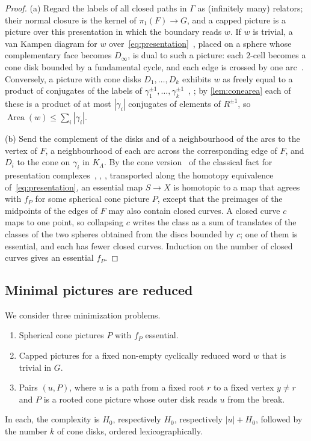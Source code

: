 \documentclass[11pt]{article}
\theoremstyle{definition}
\theoremstyle{plain}
\newcommand{\Area}{\operatorname{Area}}
\begin{document}
\begin{proof}
(a) Regard the labels of all closed paths in $\Gamma$ as (infinitely many) relators; their normal closure is the kernel of $\pi_1(F)\to G$, and a capped picture is a picture over this presentation in which the boundary reads $w$. If $w$ is trivial, a van Kampen diagram for $w$ over~\eqref{eq:presentation}~\cite[Ch.~V]{LyndonSchupp1977}, placed on a sphere whose complementary face becomes $D_\infty$, is dual to such a picture: each $2$-cell becomes a cone disk bounded by a fundamental cycle, and each edge is crossed by one arc~\cite{Rourke1979,Pride1991}. Conversely, a picture with cone disks $D_1,\dots,D_k$ exhibits $w$ as freely equal to a product of conjugates of the labels of $\gamma_1^{\pm1},\dots,\gamma_k^{\pm1}$~\cite[\S1]{Pride1991}, \cite{BogleyPride1993}; by \cref{lem:conearea} each of these is a product of at most $|\gamma_i|$ conjugates of elements of $R^{\pm1}$, so $\Area(w)\le\sum_i|\gamma_i|$.

(b) Send the complement of the disks and of a neighbourhood of the arcs to the vertex of $F$, a neighbourhood of each arc across the corresponding edge of $F$, and $D_i$ to the cone on $\gamma_i$ in $K_\Lambda$. By the cone version~\cite[Lemma~5.2]{OAI196} of the classical fact for presentation complexes~\cite{Rourke1979}, \cite[\S1]{Pride1991}, \cite{BogleyPride1993}, transported along the homotopy equivalence of~\eqref{eq:presentation}, an essential map $S\to X$ is homotopic to a map that agrees with $f_P$ for some spherical cone picture $P$, except that the preimages of the midpoints of the edges of $F$ may also contain closed curves. A closed curve $c$ maps to one point, so collapsing $c$ writes the class as a sum of translates of the classes of the two spheres obtained from the discs bounded by $c$; one of them is essential, and each has fewer closed curves. Induction on the number of closed curves gives an essential $f_P$.
\end{proof}

\subsection{Minimal pictures are reduced}
We consider three minimization problems.
\begin{enumerate}[itemsep=0pt]
\item[\textup{(S)}] Spherical cone pictures $P$ with $f_P$ essential.
\item[\textup{(F)}] Capped pictures for a fixed non-empty cyclically reduced word $w$ that is trivial in $G$.
\item[\textup{(R)}] Pairs $(u,P)$, where $u$ is a path from a fixed root $r$ to a fixed vertex $y\neq r$ and $P$ is a rooted cone picture whose outer disk reads $u$ from the break.
\end{enumerate}
In each, the complexity is $H_0$, respectively $H_0$, respectively $|u|+H_0$, followed by the number $k$ of cone disks, ordered lexicographically.
\end{document}
